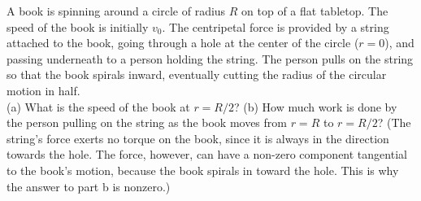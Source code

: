 A book is spinning around a circle of radius $R$ on top of a flat
tabletop. The speed of the book is initially $v_0$. The centripetal
force is provided by a string attached to the book, going through a
hole at the center of the circle ($r=0$), and passing
underneath to a person holding the string. The person pulls on
the string so that the book spirals inward,
eventually cutting the radius of the circular motion in half.\\
%
(a) What is the speed of the book at $r = R/2$?\answercheck\hwendpart
%
(b) How much work is done by the person pulling on the string as
the book moves from $r=R$ to $r=R/2$?\answercheck\hwendpart
%
\noindent (The string's force exerts no torque on the book, since it is
always in the direction towards the hole. The force, however,
can have a non-zero component tangential to the book's motion, because the book
spirals in toward the hole. This is why the answer to part b is
nonzero.)
